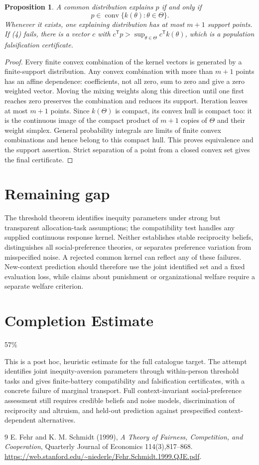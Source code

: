 \documentclass[11pt]{article}
\newtheorem{proposition}[theorem]{Proposition}
\theoremstyle{definition}
\begin{document}
\begin{proposition}
A common distribution explains $p$ if and only if
\[
 p\in\operatorname{conv}\{k(\theta):\theta\in\Theta\}.     \tag{4}
\]
Whenever it exists, one explaining distribution has at most $m+1$
support points. If (4) fails, there is a vector $c$ with
$c^{\mathsf T}p>\sup_{\theta\in\Theta}c^{\mathsf T}k(\theta)$,
which is a population falsification certificate.
\end{proposition}
\begin{proof}
Every finite convex combination of the kernel vectors is generated by
a finite-support distribution. Any convex combination with more than
$m+1$ points has an affine dependence: coefficients, not all zero,
sum to zero and give a zero weighted vector. Moving the mixing weights
along this direction until one first reaches zero preserves the
combination and reduces its support. Iteration leaves at most $m+1$
points. Since $k(\Theta)$ is compact, its convex hull is compact too:
it is the continuous image of the compact product of $m+1$ copies of
$\Theta$ and their weight simplex. General probability integrals are
limits of finite convex combinations and hence belong to this compact
hull. This proves equivalence and the support assertion. Strict separation
of a point from a closed convex set gives the final certificate.
\end{proof}

\section*{Remaining gap}
The threshold theorem identifies inequity parameters under strong but
transparent allocation-task assumptions; the compatibility test handles
any supplied continuous response kernel. Neither establishes stable
reciprocity beliefs, distinguishes all social-preference theories, or
separates preference variation from misspecified noise. A rejected common
kernel can reflect any of these failures. New-context prediction should
therefore use the joint identified set and a fixed evaluation loss, while
claims about punishment or organizational welfare require a separate
welfare criterion.

\section{Completion Estimate}
57\%

This is a post hoc, heuristic estimate for the full catalogue target.
The attempt identifies joint inequity-aversion parameters through within-person threshold tasks and gives finite-battery compatibility and falsification certificates, with a concrete failure of marginal transport. Full context-invariant social-preference assessment still requires credible beliefs and noise models, discrimination of reciprocity and altruism, and held-out prediction against prespecified context-dependent alternatives.

\begin{thebibliography}{9}
 E. Fehr and K. M. Schmidt (1999), \emph{A Theory of
Fairness, Competition, and Cooperation}, Quarterly Journal of Economics
114(3),817--868.
\url{https://web.stanford.edu/~niederle/Fehr.Schmidt.1999.QJE.pdf}.
\end{thebibliography}
\end{document}
